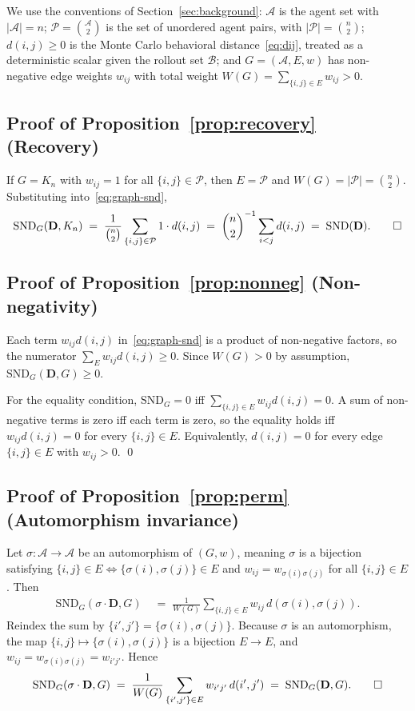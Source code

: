 \documentclass{article}
\theoremstyle{plain}
\theoremstyle{definition}
\theoremstyle{remark}
\newcommand{\Agents}{\mathcal{A}}        %
\newcommand{\Rollouts}{\mathcal{B}}      %
\newcommand{\Pairs}{\mathcal{P}}         %
\newcommand{\SND}{\ensuremath{\mathrm{SND}}}
\newcommand{\SNDG}{\mathrm{SND}_{G}}
\begin{document}
We use the conventions of Section~\ref{sec:background}: $\Agents$ is the
agent set with $|\Agents| = n$; $\Pairs = \binom{\Agents}{2}$ is the set
of unordered agent pairs, with $|\Pairs| = \binom{n}{2}$; $d(i,j) \geq 0$
is the Monte Carlo behavioral distance~\eqref{eq:dij}, treated as a
deterministic scalar given the rollout set $\Rollouts$; and $G = (\Agents,
E, w)$ has non-negative edge weights $w_{ij}$ with total weight
$W(G) = \sum_{\{i,j\} \in E} w_{ij} > 0$.

\subsection*{Proof of Proposition~\ref{prop:recovery} (Recovery)}

If $G = K_n$ with $w_{ij} = 1$ for all $\{i,j\} \in \Pairs$, then
$E = \Pairs$ and $W(G) = |\Pairs| = \binom{n}{2}$. Substituting
into~\eqref{eq:graph-snd},
\[
\SNDG(\mathbf{D}, K_n)
\;=\; \frac{1}{\binom{n}{2}} \sum_{\{i,j\} \in \Pairs} 1 \cdot d(i,j)
\;=\; \binom{n}{2}^{-1} \sum_{i < j} d(i,j)
\;=\; \SND(\mathbf{D}). \qed
\]

\subsection*{Proof of Proposition~\ref{prop:nonneg} (Non-negativity)}

Each term $w_{ij} d(i,j)$ in~\eqref{eq:graph-snd} is a product of
non-negative factors, so the numerator $\sum_{E} w_{ij} d(i,j) \geq 0$.
Since $W(G) > 0$ by assumption, $\SNDG(\mathbf{D}, G) \geq 0$.

For the equality condition, $\SNDG = 0$ iff
$\sum_{\{i,j\} \in E} w_{ij} d(i,j) = 0$. A sum of non-negative terms is
zero iff each term is zero, so the equality holds iff $w_{ij} d(i,j) = 0$
for every $\{i,j\} \in E$. Equivalently, $d(i,j) = 0$ for every edge
$\{i,j\} \in E$ with $w_{ij} > 0$. \qed

\subsection*{Proof of Proposition~\ref{prop:perm} (Automorphism invariance)}

Let $\sigma : \Agents \to \Agents$ be an automorphism of $(G, w)$, meaning
$\sigma$ is a bijection satisfying $\{i,j\} \in E \iff \{\sigma(i),
\sigma(j)\} \in E$ and $w_{ij} = w_{\sigma(i)\sigma(j)}$ for all
$\{i,j\} \in E$. Then
\begin{align*}
\SNDG(\sigma \cdot \mathbf{D}, G)
&\;=\; \frac{1}{W(G)} \sum_{\{i,j\} \in E} w_{ij}\, d(\sigma(i), \sigma(j)).
\end{align*}
Reindex the sum by $\{i', j'\} = \{\sigma(i), \sigma(j)\}$. Because
$\sigma$ is an automorphism, the map $\{i,j\} \mapsto \{\sigma(i),
\sigma(j)\}$ is a bijection $E \to E$, and $w_{ij} =
w_{\sigma(i)\sigma(j)} = w_{i'j'}$. Hence
\[
\SNDG(\sigma \cdot \mathbf{D}, G)
\;=\; \frac{1}{W(G)} \sum_{\{i',j'\} \in E} w_{i'j'}\, d(i', j')
\;=\; \SNDG(\mathbf{D}, G). \qed
\]
\end{document}
